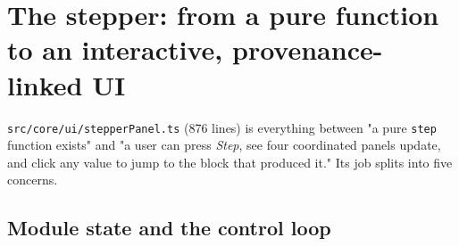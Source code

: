 \documentclass[11pt]{article}
\begin{document}
\section{The stepper: from a pure function to an interactive, provenance-linked UI}
\label{sec:ui}

\texttt{src/core/ui/stepperPanel.ts} (876 lines) is everything between "a
pure \texttt{step} function exists" and "a user can press \emph{Step}, see
four coordinated panels update, and click any value to jump to the block
that produced it." Its job splits into five concerns.

\subsection{Module state and the control loop}
\label{sec:controls}
\end{document}
